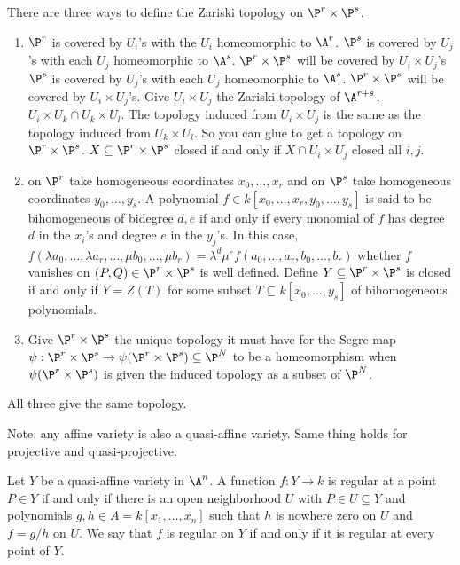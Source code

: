There are three ways to define the Zariski topology on $\P^r \times \P^s$. 

\begin{enumerate}[1.]

\item 

$\P^r$ is covered by $U_i$'s with the $U_i$ homeomorphic to $\A^r$. $\P^s$ is covered by $U_j$'s with each $U_j$ homeomorphic to $\A^s$. $\P^r \times \P^s$ will be covered by $U_i \times U_j$'s $\P^s$ is covered by $U_j$'s with each $U_j$ homeomorphic to $\A^s$. $\P^r \times \P^s$ will be covered by $U_i \times U_j$'s. Give $U_i \times U_j$ the Zariski topology of $\A^{r+s}$, $U_i \times U_k \cap U_k \times U_l$. The topology induced from $U_i \times U_j$ is the same as the topology induced from $U_k \times U_l$. So you can glue to get a topology on $\P^r \times \P^s$. $X \subseteq \P^r \times \P^s$ closed if and only if $X \cap U_i \times U_j$ closed all $i,j$. 

\item on $\P^r$ take homogeneous coordinates $x_0,\ldots,x_r$ and on $\P^s$ take homogeneous coordinates $y_0,\ldots,y_s$. A polynomial $f \in k[x_0,\ldots,x_r,y_0,\ldots,y_s]$ is said to be bihomogeneous of bidegree $d,e$ if and only if every monomial of $f$ has degree $d$ in the $x_i$'s and degree $e$ in the $y_j$'s. In this case, $f(\lambda a_0,\ldots, \lambda a_r,\ldots,\mu b_0,\ldots,\mu b_r)= \lambda^d \mu^e f(a_0,\ldots,a_r,b_0,\ldots,b_r)$ whether $f$ vanishes on $(P,Q) \in \P^r \times \P^s$ is well defined. Define $Y \subseteq \P^r \times \P^s$ is closed if and only if $Y= Z(T)$ for some subset $T \subseteq k[x_0,\ldots,y_s]$ of bihomogeneous polynomials.


\item Give $\P^r \times \P^s$ the unique topology it must have for the Segre map $\psi: \P^r \times \P^s \to \psi(\P^r \times \P^s) \subseteq \P^N$ to be a homeomorphism when $\psi(\P^r \times \P^s)$ is given the induced topology as a subset of $\P^N$.
\end{enumerate}


All three give the same topology. 







Note: any affine variety is also a quasi-affine variety. Same thing holds for projective and quasi-projective.


\begin{dfn}[Regular]
Let $Y$ be a quasi-affine variety in $\A^n$. A function $f: Y \to k$ is regular at a point $P \in Y$ if and only if there is an open neighborhood $U$ with $P \in U \subseteq Y$ and polynomials $g, h \in A= k[x_1,\ldots,x_n]$ such that $h$ is nowhere zero on $U$ and $f= g/h$ on $U$. We say that $f$ is regular on $Y$ if and only if it is regular at every point of $Y$.
\end{dfn}

